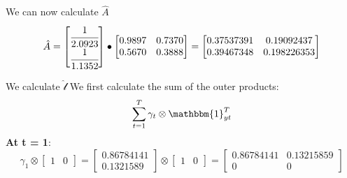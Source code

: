 We can now calculate $\hat{A}$
\[
\hat{A} = \begin{bmatrix}
    \cfrac{1}{2.0923} \\ \cfrac{1}{1.1352}
\end{bmatrix} \bullet \begin{bmatrix}
    0.9897 & 0.7370 \\ 0.5670 & 0.3888
\end{bmatrix} = \begin{bmatrix}
    0.37537391 & 0.19092437 \\ 0.39467348 & 0.198226353
\end{bmatrix}
\]

We calculate $\hat{\mathcal{l}}$
We first calculate the sum of the outer products:
\[
\sum_{t=1}^T \gamma_t \otimes \mathbbm{1}_{yt}^T 
\]
\textbf{At t = 1}:
\[
\gamma_1 \otimes \begin{bmatrix}
    1 & 0 \end{bmatrix} = \begin{bmatrix}
        0.86784141 \\ 0.1321589    
    \end{bmatrix} \otimes \begin{bmatrix}
        1 & 0 \end{bmatrix} = \begin{bmatrix}
            0.86784141 & 0.13215859 \\
        0 & 0           
        \end{bmatrix}
\]

